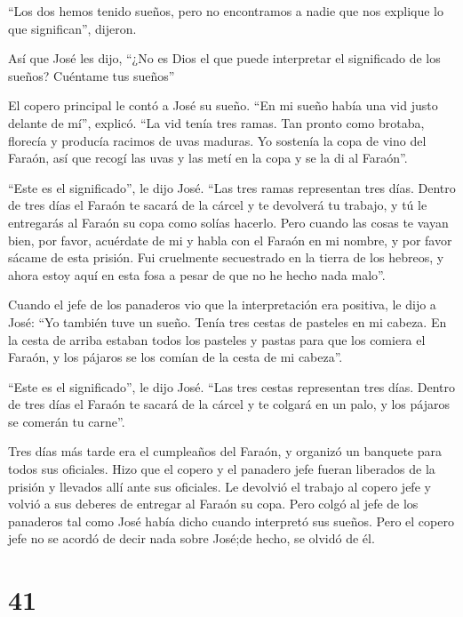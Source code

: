  ``Los dos hemos tenido sueños, pero no encontramos a nadie
que nos explique lo que significan'', dijeron.

Así que José les dijo, ``¿No es Dios el que puede interpretar el
significado de los sueños? Cuéntame tus sueños''

 El copero principal le contó a José su sueño. ``En mi sueño
había una vid justo delante de mí'', explicó.  ``La vid
tenía tres ramas. Tan pronto como brotaba, florecía y producía racimos
de uvas maduras.  Yo sostenía la copa de vino del Faraón,
así que recogí las uvas y las metí en la copa y se la di al Faraón''.

 ``Este es el significado'', le dijo José. ``Las tres ramas
representan tres días.  Dentro de tres días el Faraón te
sacará de la cárcel y te devolverá tu trabajo, y tú le entregarás al
Faraón su copa como solías hacerlo.  Pero cuando las cosas
te vayan bien, por favor, acuérdate de mi y habla con el Faraón en mi
nombre, y por favor sácame de esta prisión.  Fui cruelmente
secuestrado en la tierra de los hebreos, y ahora estoy aquí en esta fosa
a pesar de que no he hecho nada malo''.

 Cuando el jefe de los panaderos vio que la interpretación
era positiva, le dijo a José: ``Yo también tuve un sueño. Tenía tres
cestas de pasteles en mi cabeza.  En la cesta de arriba
estaban todos los pasteles y pastas para que los comiera el Faraón, y
los pájaros se los comían de la cesta de mi cabeza''.

 ``Este es el significado'', le dijo José. ``Las tres
cestas representan tres días.  Dentro de tres días el
Faraón te sacará de la cárcel y te colgará en un palo, y los pájaros se
comerán tu carne''.

 Tres días más tarde era el cumpleaños del Faraón, y
organizó un banquete para todos sus oficiales. Hizo que el copero y el
panadero jefe fueran liberados de la prisión y llevados allí ante sus
oficiales.  Le devolvió el trabajo al copero jefe y volvió
a sus deberes de entregar al Faraón su copa.  Pero colgó al
jefe de los panaderos tal como José había dicho cuando interpretó sus
sueños.  Pero el copero jefe no se acordó de decir nada
sobre José;de hecho, se olvidó de él.

\hypertarget{section-40}{%
\section{41}\label{section-40}}

